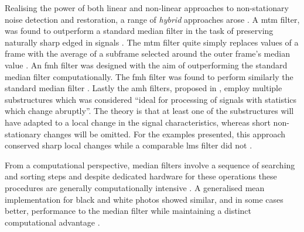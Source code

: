 Realising the power of both linear and non-linear approaches to non-stationary noise detection and restoration, a range of \emph{hybrid} approaches arose \cite{Nieminen1987a}\cite{Lee1985}\cite{Heinonen1987}. A \gls{mtm} filter, was found to outperform a standard median filter in the task of preserving naturally sharp edged in signals \cite{Lee1985}. The \gls{mtm} filter quite simply replaces values of a frame with the average of a subframe selected around the outer frame's median value \cite{Lee1985}. An \gls{fmh} filter was designed with the aim of outperforming the standard median filter computationally. The \gls{fmh} filter was found to perform similarly the standard median filter \cite{Heinonen1987}. Lastly the \gls{amh} filters, proposed in \cite{Nieminen1987a}, employ multiple substructures which was considered ``ideal for processing of signals with statistics which change abruptly''. The theory is that at least one of the substructures will have adapted to a local change in the signal characteristics, whereas short non-stationary changes will be omitted. For the examples presented, this approach conserved sharp local changes while a comparable \gls{lms} filter did not \cite{Nieminen1987a}.

From a computational perspective, median filters involve a sequence of searching and sorting steps and despite dedicated hardware for these operations these procedures are generally computationally intensive \cite{Kundu1984}. A generalised mean implementation for black and white photos showed similar, and in some cases better, performance to the median filter while maintaining a distinct computational advantage \cite{Kundu1984}.




